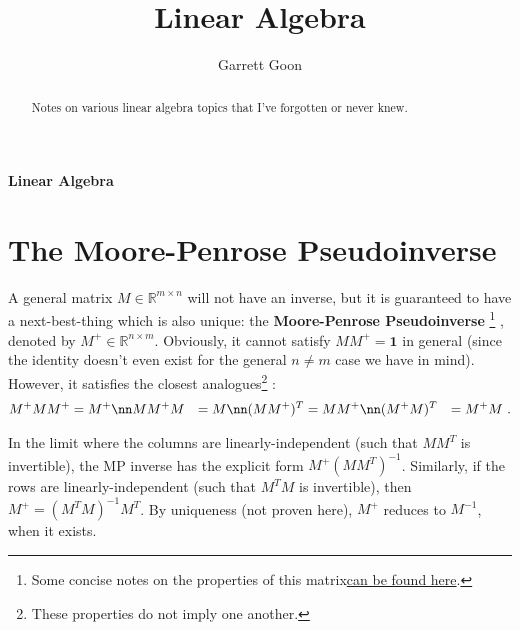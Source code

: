 \documentclass[11pt]{article}
\title{Linear Algebra}
\author{Garrett Goon}
\begin{document}
%

\vspace{1truecm}
%
%
\renewcommand{\thefootnote}{\fnsymbol{footnote}}
\begin{center}
{\huge \bf{Linear Algebra}}
\end{center}


\begin{abstract}

Notes on various linear algebra topics that I've forgotten or never knew.

\end{abstract}

\tableofcontents


\renewcommand*{\thefootnote}{\arabic{footnote}}
\setcounter{footnote}{0}

\section{The Moore-Penrose Pseudoinverse \label{sec_mp_pseudoinverse}}

A general matrix $ M \in \mathbb{R} ^{ m\times n } $ will not have an inverse, but it is guaranteed to have a next-best-thing which is
also unique: the \textbf{Moore-Penrose Pseudoinverse} \footnote{Some concise notes on the properties
of this matrix\href{https://www.math.ucla.edu/~laub/33a.2.12s/mppseudoinverse.pdf}{can be found
here}.} , denoted by $ M ^{ + } \in \mathbb{R}^{
n\times m } $.  Obviously, it
cannot satisfy $ M M ^{ + } = \mathbf{1} $ in general (since the identity doesn't even exist for the
general $ n \neq m $ case we have in mind). However, it satisfies the closest analogues\footnote{These properties do not imply one another.} :
\begin{align}
  M ^{ + }M M ^{ + } &= M ^{ + } \nn
  M M ^{ + } M  &= M  \nn
  (M M ^{ + }) ^{ T } &= M M ^{ + } \nn
   (M ^{ + } M ) ^{ T } &= M ^{ + }M \ . \label{eq_mp_pseudoinverse}
\end{align}


In the limit where the columns are linearly-independent (such that $ M M ^{ T } $ is invertible), the MP
inverse has the explicit form $ M ^{ + } (M M ^{ T })^{ -1 } $. Similarly, if the rows are
linearly-independent (such that $ M ^{ T } M  $ is invertible), then $ M ^{ + } = (M ^{ T }M) ^{ -1
}  M ^{ T }$. By uniqueness (not proven here), $ M ^{ + } $ reduces to $ M ^{ -1 } $, when it
exists.
\end{document}
